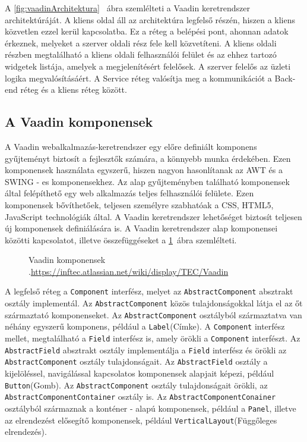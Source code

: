 A \ref{fig:vaadinArchitektura}~ ábra szemlélteti a Vaadin keretrendszer architektúráját.
A kliens oldal áll az architektúra legfelső részén, hiszen a kliens közvetlen ezzel kerül kapcsolatba. Ez a réteg a belépési pont, ahonnan adatok érkeznek, melyeket a szerver oldali rész fele kell közvetíteni. A kliens oldali részben megtalálható a kliens oldali felhasználói felület és az ehhez tartozó widgetek listája, amelyek a megjelenítésért felelősek. 
A szerver felelős az üzleti logika megvalósításáért. A Service réteg valósítja meg a kommunikációt a Back-end réteg és a kliens réteg között. 


\subsection{A Vaadin komponensek}\label{sec:Vaadin komponensek}

A Vaadin webalkalmazás-keretrendszer egy előre definiált komponens gyűjteményt biztosít a fejlesztők számára, a könnyebb munka érdekében. Ezen komponensek használata egyszerű, hiszen nagyon hasonlítanak az AWT és a SWING  - es komponensekhez. Az alap gyűjteményben található komponensek által felépíthető egy web alkalmazás teljes felhasználói felülete. Ezen komponensek bővíthetőek, teljesen személyre szabhatóak a CSS, HTML5, JavaScript technológiák által. A Vaadin keretrendszer lehetőséget biztosít teljesen új komponensek definiálására is.
A Vaadin keretrendszer alap komponensei közötti kapcsolatot, illetve összefüggéseket a \ref{fig:vaadinComponents}~ábra szemlélteti. 
\begin{figure}[h!]
  \centering
  \caption[Vaadin keretrendszer komponensei]%
  {Vaadin komponensek\\
  {\white .}\hfill\url{https://inftec.atlassian.net/wiki/display/TEC/Vaadin}}
  \label{fig:vaadinComponents}
\end{figure} 

A legfelső réteg a \texttt{Component} interfész, melyet az \texttt{AbstractComponent} absztrakt osztály implementál. Az \texttt{AbstractComponent} közös tulajdonságokkal látja el az őt származtató komponenseket. Az \texttt{AbstractComponent} osztályból származtatva van néhány egyszerű komponens, például a \texttt{Label}(Címke). A \texttt{Component} interfész mellet, megtalálható a  \texttt{Field} interfész is, amely örökli a \texttt{Component} interfészt. Az \texttt{AbstractField} absztrakt osztály implementálja a  \texttt{Field} interfész és örökli az \texttt{AbstractComponent} osztály tulajdonságait. Az \texttt{AbstractField} osztály a kijelöléssel, navigálással kapcsolatos komponensek alapjait képezi, például \texttt{Button}(Gomb). Az \texttt{AbstractComponent} osztály tulajdonságait örökli, az \texttt{AbstractComponentContainer} osztály is. Az \texttt{AbstractComponentConainer} osztályból származnak a konténer - alapú komponensek, például a  \texttt{Panel}, illetve az elrendezést elősegítő komponensek, például \texttt{VerticalLayout}(Függőleges elrendezés).



